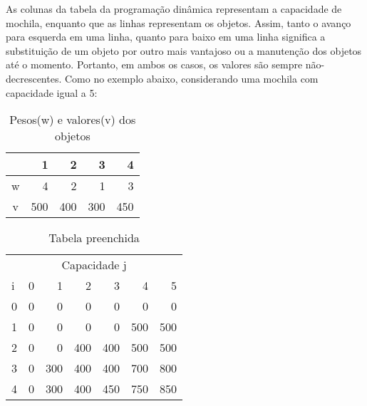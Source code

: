As colunas da tabela da programação dinâmica representam a capacidade de mochila,
enquanto que as linhas representam os objetos. Assim, tanto o avanço para esquerda
em uma linha, quanto para baixo em uma linha significa a substituição de um objeto
por outro mais vantajoso ou a manutenção dos objetos até o momento. Portanto, em
ambos os casos, os valores são sempre não-decrescentes. Como no exemplo abaixo,
considerando uma mochila com capacidade igual a 5:

\begin{table}[ht]
    \begin{center}
      \begin{tabular}{c|rrrr}
& 1 & 2 & 3 & 4 \\
        \hline
w & 4   & 2   & 1   & 3 \\
v & 500 & 400 & 300 & 450 \\
      \end{tabular}
    \end{center}
    \caption{Pesos(w) e valores(v) dos objetos}
  \end{table}

\begin{table}[ht]
    \begin{center}
      \begin{tabular}{l|rrrrrr}
        \multicolumn{7}{c}{Capacidade j}\\
i & 0 & 1 & 2 & 3 & 4 & 5 \\
        \hline
0 & 0 & 0   & 0   & 0     & 0     & 0 \\
1 & 0 & 0   & 0   & 0     & 500   & 500 \\
2 & 0 & 0   & 400 & 400   & 500   & 500 \\
3 & 0 & 300 & 400 & 400   & 700   & 800 \\
4 & 0 & 300 & 400 & 450   & 750   & 850 \\
      \end{tabular}
    \end{center}
    \caption{Tabela preenchida}
  \end{table}
